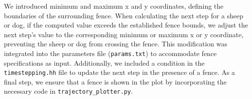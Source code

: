 We introduced minimum and maximum x and y coordinates, defining the boundaries of the surrounding fence. When calculating the next step for a sheep or dog, if the computed value exceeds the established fence bounds, we adjust the next step's value to the corresponding minimum or maximum x or y coordinate, preventing the sheep or dog from crossing the fence. This modification was integrated into the parameters file (\texttt{params.txt}) to accommodate fence specifications as input. Additionally, we included a condition in the \texttt{timestepping.hh} file to update the next step in the presence of a fence. As a final step, we ensure that a fence is shown in the plot by incorporating the necessary code in \texttt{trajectory\_plotter.py}.